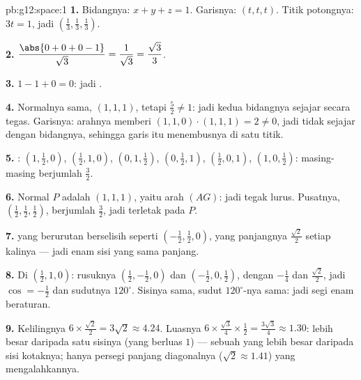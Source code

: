 \begin{solution}{pb:g12:space:1}
\textbf{1.} Bidangnya: $x + y + z = 1$. Garisnya: $(t, t, t)$.
Titik potongnya: $3t = 1$, jadi
$\left(\frac13, \frac13, \frac13\right)$.

\textbf{2.} $\dfrac{\abs{0 + 0 + 0 - 1}}{\sqrt3} =
\dfrac{1}{\sqrt3} = \dfrac{\sqrt3}{3}$.

\textbf{3.} $1 - 1 + 0 = 0$: jadi .

\textbf{4.} Normalnya sama, $(1,1,1)$, tetapi $\frac52 \neq 1$:
jadi kedua bidangnya sejajar secara tegas. Garisnya: arahnya memberi
$(1,1,0) \cdot (1,1,1) = 2 \neq 0$, jadi tidak sejajar dengan bidangnya,
sehingga garis itu menembusnya di satu titik.

\textbf{5.} : $\left(1, \frac12, 0\right)$,
$\left(\frac12, 1, 0\right)$, $\left(0, 1, \frac12\right)$,
$\left(0, \frac12, 1\right)$, $\left(\frac12, 0, 1\right)$,
$\left(1, 0, \frac12\right)$: masing-masing berjumlah 
$\frac32$.

\textbf{6.} Normal $P$ adalah $(1,1,1)$, yaitu arah
$(AG)$: jadi tegak lurus. Pusatnya,
$\left(\frac12,\frac12,\frac12\right)$, berjumlah 
$\frac32$, jadi terletak pada $P$.

\textbf{7.}  yang berurutan berselisih  seperti
$\left(-\frac12, \frac12, 0\right)$, yang panjangnya
$\frac{\sqrt2}{2}$ setiap kalinya --- jadi enam sisi yang sama panjang.

\textbf{8.} Di $\left(\frac12, 1, 0\right)$:  rusuknya
$\left(\frac12, -\frac12, 0\right)$ dan
$\left(-\frac12, 0, \frac12\right)$, dengan  $-\frac14$
dan  $\frac{\sqrt2}{2}$, jadi $\cos = -\frac12$ dan sudutnya
$120^\circ$. Sisinya sama, sudut $120^\circ$-nya sama: jadi segi enam
beraturan.

\textbf{9.} Kelilingnya $6 \times \frac{\sqrt2}{2} = 3\sqrt2
\approx 4.24$. Luasnya $6 \times \frac{\sqrt3}{4} \times
\frac12 = \frac{3\sqrt3}{4} \approx 1.30$: lebih besar daripada satu sisinya
(yang berluas $1$) --- sebuah  yang lebih besar daripada sisi kotaknya; hanya
persegi panjang diagonalnya ($\sqrt2 \approx 1.41$) yang mengalahkannya.


\end{solution}

